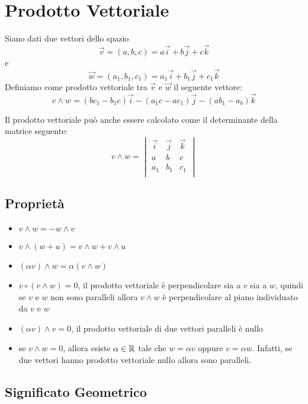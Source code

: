 \section{Prodotto Vettoriale}

\begin{definition}
Siano dati due vettori dello spazio $$\vec{v} = (a,b,c) = a\vec{i}+b\vec{j}+c\vec{k}$$
e
$$\vec{w} = (a_1,b_1,c_1) = a_1\vec{i}+b_1\vec{j}+c_1\vec{k}$$
Definiamo come prodotto vettoriale tra $\vec{v}$ e $\vec{w}$ il seguente vettore:
$$v \wedge w = (bc_1-b_1c)\vec{i}-(a_1c-ac_1)\vec{j}-(ab_1-a_b)\vec{k}$$
\end{definition}

Il prodotto vettoriale può anche essere calcolato come il determinante della matrice seguente:
$$
v \wedge w =
\begin{vmatrix}
    \vec{i} & \vec{j} & \vec{k} \\
    a       & b       & c       \\
    a_1     & b_1     & c_1     \\
\end{vmatrix}
$$

\subsection{Proprietà}

\begin{itemize}
\item $v \wedge w = -w \wedge v$
\item $v \wedge (w+u) = v \wedge w + v \wedge u$
\item $(\alpha v) \wedge w = \alpha(v \wedge w)$
\item $v \circ (v \wedge w) = 0$, il prodotto vettoriale è perpendicolare sia a $v$ sia a $w$, quindi se $v$ e $w$ non sono paralleli allora $v \wedge w$ è perpendicolare al piano individuato da $v$ e $w$
\item $(\alpha v) \wedge v = 0$, il prodotto vettoriale di due vettori paralleli è nullo
\item se $ v \wedge w = 0$, allora esiste $\alpha \in \mathbb{R}$ tale che $w = \alpha v$ oppure $v = \alpha w$. Infatti, se due vettori hanno prodotto vettoriale nullo allora sono paralleli.
\end{itemize}

\subsection{Significato Geometrico}

